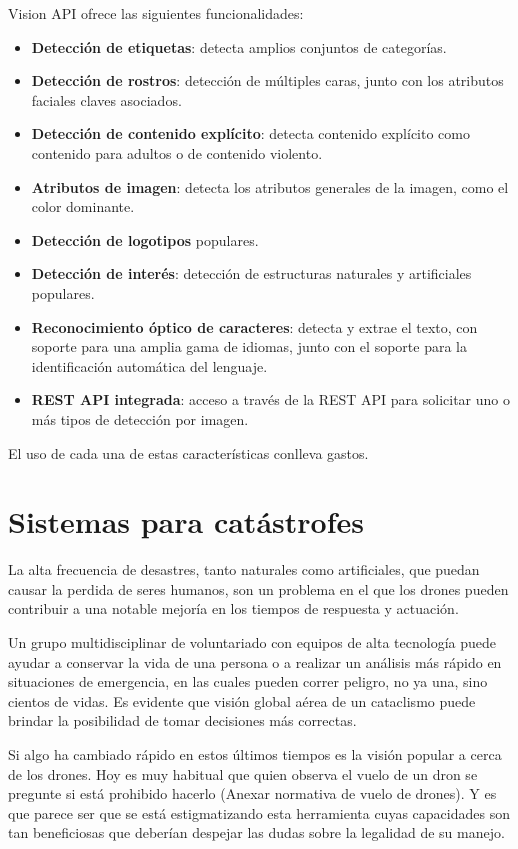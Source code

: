 Vision API ofrece las siguientes funcionalidades:
\begin{itemize}
\item \textbf{Detección de etiquetas}: detecta amplios conjuntos de categorías.
\item \textbf{Detección de rostros}: detección de múltiples caras, junto con los atributos faciales claves asociados.
\item \textbf{Detección de contenido explícito}: detecta contenido explícito como contenido para adultos o de contenido violento.
\item \textbf{Atributos de imagen}: detecta los atributos generales de la imagen, como el color dominante.
\item \textbf{Detección de logotipos} populares.
\item \textbf{Detección de interés}: detección de estructuras naturales y artificiales populares.
\item \textbf{Reconocimiento óptico de caracteres}: detecta y extrae el texto, con soporte para una amplia gama de idiomas, junto con el soporte para la identificación automática del lenguaje.
\item \textbf{REST API integrada}: acceso a través de la REST API para solicitar uno o más tipos de detección por imagen.
\end{itemize}

El uso de cada una de estas características conlleva gastos.

\section{Sistemas para catástrofes}
\label{sec:sistemas}

La alta frecuencia de desastres, tanto naturales como artificiales, que puedan causar la perdida de seres humanos, son un problema en el que los drones pueden contribuir a una notable mejoría en los tiempos de respuesta y actuación.

Un grupo multidisciplinar de voluntariado con equipos de alta tecnología puede ayudar a conservar la vida de una persona o a realizar un análisis más rápido en situaciones de emergencia, en las cuales pueden correr peligro, no ya una, sino cientos de vidas. Es evidente que visión global aérea de un cataclismo puede brindar la posibilidad de tomar decisiones más correctas.

Si algo ha cambiado rápido en estos últimos tiempos es la visión popular a cerca de los drones. Hoy es muy habitual que quien observa el vuelo de un dron se pregunte si está prohibido hacerlo (Anexar normativa de vuelo de drones). Y es que parece ser que se está estigmatizando esta herramienta cuyas capacidades son tan beneficiosas que deberían despejar las dudas sobre la legalidad de su manejo.

